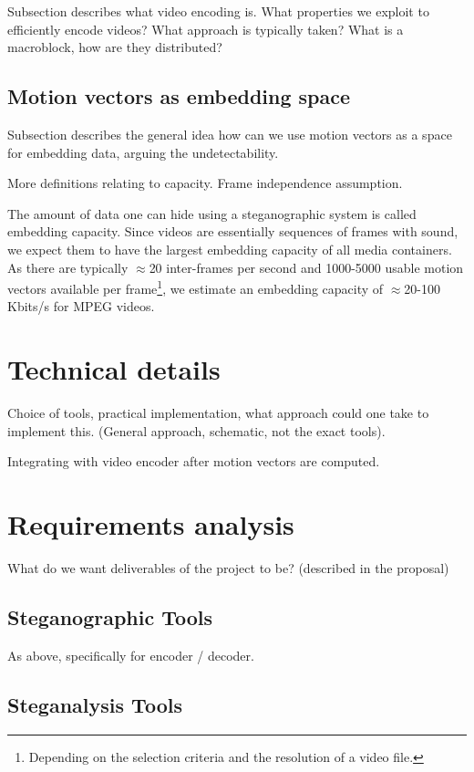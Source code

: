 \documentclass[12pt,british,twoside,notitlepage,usenames,dvipsnames,hypens,final]{report}
\numberwithin{equation}{section}
\numberwithin{figure}{section}
\begin{document}
Subsection describes what video encoding is. What properties we exploit to efficiently encode videos? What approach is typically taken? What is a macroblock, how are they distributed?

\subsection{Motion vectors as embedding space}

Subsection describes the general idea how can we use motion vectors as a space for embedding data, arguing the undetectability.

More definitions relating to capacity. Frame independence assumption.

The amount of data one can hide using a steganographic system is called embedding capacity. Since videos are essentially sequences of frames with sound, we expect them to have the largest embedding capacity of all media containers. As there are typically $\approx$20 inter-frames per second and 1000-5000 usable motion vectors available per frame\footnote{Depending on the selection criteria and the resolution of a video file.}, we estimate an embedding capacity of $\approx$20-100 Kbits/s for MPEG videos.

\section{Technical details}

Choice of tools, practical implementation, what approach could one take to implement this. (General approach, schematic, not the exact tools).

Integrating with video encoder after motion vectors are computed.

\section{Requirements analysis}

What do we want deliverables of the project to be? (described in the proposal)

\subsection{Steganographic Tools}

As above, specifically for encoder / decoder.

\subsection{Steganalysis Tools}
\end{document}
